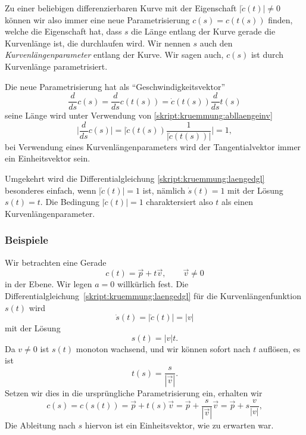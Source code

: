Zu einer beliebigen differenzierbaren Kurve mit der Eigenschaft
$|\dot c(t)|\ne 0$ können wir also immer eine neue Parametrisierung
$c(s)=c(t(s))$ finden, welche die Eigenschaft hat, dass $s$ die
Länge entlang der Kurve gerade die Kurvenlänge ist, die durchlaufen
wird.
Wir nennen $s$ auch den {\em Kurvenlängenparameter} entlang der
Kurve.
Wir sagen auch, $c(s)$ ist durch Kurvenlänge parametrisiert.

Die neue Parametrisierung hat als ``Geschwindigkeitsvektor''
\[
\frac{d}{ds} c(s)
=
\frac{d}{ds} c(t(s))
=
\dot c(t(s)) \frac{d}{ds}t(s)
\]
seine Länge wird unter Verwendung von
\eqref{skript:kruemmung:abllaengeinv}
\[
\biggl|
\frac{d}{ds} c(s)
\biggr|
=
\biggl|\dot c(t(s))\frac1{|\dot c(t(s))|}\biggr|
=
1,
\]
bei Verwendung eines Kurvenlängenparameters wird der Tangentialvektor
immer ein Einheitsvektor sein.

Umgekehrt wird die Differentialgleichung \eqref{skript:kruemmung:laengedgl}
besonderes einfach, wenn $|\dot c(t)|=1$ ist, nämlich $\dot s(t)=1$ mit
der Lösung $s(t)=t$.
Die Bedingung $|\dot c(t)|=1$ charaktersiert also $t$ als einen
Kurvenlängenparameter.

\subsubsection{Beispiele}
\begin{beispiel}
Wir betrachten eine Gerade 
\[
c(t)=\vec p + t\vec v,\qquad \vec v\ne 0
\]
in der Ebene.
Wir legen $a=0$ willkürlich fest.
Die Differentialgleichung~\eqref{skript:kruemmung:laengedgl} für die
Kurven\-längen\-funktion $s(t)$ wird
\[
\dot s(t) = |\dot c(t)| = |v|
\]
mit der Lösung
\[
s(t)=|v|t.
\]
Da $v\ne 0$ ist $s(t)$ monoton wachsend, und wir können sofort nach
$t$ auflösen, es ist
\[
t(s)=\frac{s}{|\vec v|}.
\]
Setzen wir dies in die ursprüngliche Parametrisierung ein, erhalten
wir
\[
c(s)
=
c(s(t))
=
\vec p + t(s)\vec v
=
\vec p + \frac{s}{|\vec v|}\vec v
=
\vec p + s\frac{v}{|v|},
\]
Die Ableitung nach $s$ hiervon ist ein Einheitsvektor, wie zu erwarten
war.
\end{beispiel}

